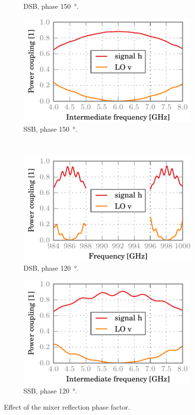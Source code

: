 \begin{figure}[hbtp]
\begin{subfigure}[b]{.5\textwidth}
        \caption{DSB, phase \SI{150}{\degree}.}
    \end{subfigure}%
    \begin{subfigure}[b]{.5\textwidth}
        \includegraphics{chapter_3/10_phase_a_h_ssb}%
        \caption{SSB, phase \SI{150}{\degree}.}
    \end{subfigure}%
    \\
    \begin{subfigure}[b]{.5\textwidth}
        \includegraphics{chapter_3/11_phase_b_h_dsb}%
        \caption{DSB, phase \SI{120}{\degree}.}
    \end{subfigure}%
    \begin{subfigure}[b]{.5\textwidth}
        \includegraphics{chapter_3/11_phase_b_h_ssb}%
        \caption{SSB, phase \SI{120}{\degree}.}
    \end{subfigure}%
    \caption{Effect of the mixer reflection phase factor.}
    \label{fig:mixer_phase_factor}
\end{figure}

